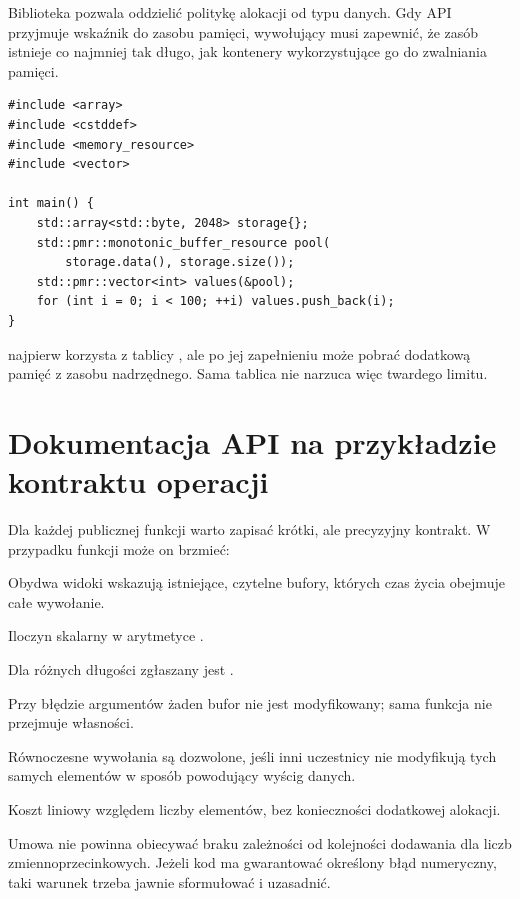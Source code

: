 Biblioteka  pozwala oddzielić politykę alokacji od
typu danych. Gdy API przyjmuje wskaźnik do zasobu pamięci, wywołujący
musi zapewnić, że zasób istnieje co najmniej tak długo, jak kontenery
wykorzystujące go do zwalniania pamięci.

\begin{lstlisting}[caption={Kontener PMR z buforem przydzielonym przez klienta (C++17).}]
#include <array>
#include <cstddef>
#include <memory_resource>
#include <vector>

int main() {
    std::array<std::byte, 2048> storage{};
    std::pmr::monotonic_buffer_resource pool(
        storage.data(), storage.size());
    std::pmr::vector<int> values(&pool);
    for (int i = 0; i < 100; ++i) values.push_back(i);
}
\end{lstlisting}

 najpierw korzysta z tablicy
, ale po jej zapełnieniu może pobrać dodatkową pamięć
z zasobu nadrzędnego. Sama tablica nie narzuca więc twardego limitu.

\section{Dokumentacja API na przykładzie kontraktu operacji}

Dla każdej publicznej funkcji warto zapisać krótki, ale precyzyjny
kontrakt. W przypadku funkcji  może on brzmieć:

\begin{description}[style=nextline]
\item[Warunki wstępne] Obydwa widoki wskazują istniejące, czytelne
bufory, których czas życia obejmuje całe wywołanie.
\item[Wynik] Iloczyn skalarny w arytmetyce .
\item[Błędy] Dla różnych długości zgłaszany jest
.
\item[Wyjątki] Przy błędzie argumentów żaden bufor nie jest
modyfikowany; sama funkcja nie przejmuje własności.
\item[Współbieżność] Równoczesne wywołania są dozwolone,
jeśli inni uczestnicy nie modyfikują tych samych elementów
w sposób powodujący wyścig danych.
\item[Wydajność] Koszt liniowy względem liczby elementów,
bez konieczności dodatkowej alokacji.
\end{description}

Umowa nie powinna obiecywać braku zależności od kolejności dodawania
dla liczb zmiennoprzecinkowych. Jeżeli kod ma gwarantować określony
błąd numeryczny, taki warunek trzeba jawnie sformułować i uzasadnić.

